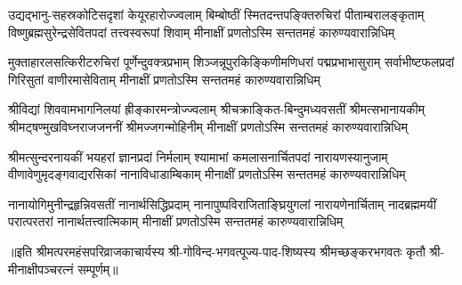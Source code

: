

\fourlineindentedshloka
{उद्यद्भानु-सहस्रकोटिसदृशां केयूरहारोज्ज्वलाम्}
{बिम्बोष्ठीं स्मितदन्तपङ्क्तिरुचिरां पीताम्बरालङ्कृताम्‌}
{विष्णुब्रह्मसुरेन्द्रसेवितपदां तत्त्वस्वरूपां शिवाम्}
{मीनाक्षीं प्रणतोऽस्मि सन्ततमहं कारुण्यवारान्निधिम्‌}%

\fourlineindentedshloka
{मुक्ताहारलसत्किरीटरुचिरां पूर्णेन्दुवक्त्रप्रभाम्}
{शिञ्जन्नूपुरकिङ्किणीमणिधरां पद्मप्रभाभासुराम्‌}
{सर्वाभीष्टफलप्रदां गिरिसुतां वाणीरमासेविताम्}
{मीनाक्षीं प्रणतोऽस्मि सन्ततमहं कारुण्यवारान्निधिम्‌}%

\fourlineindentedshloka
{श्रीविद्यां शिववामभागनिलयां ह्रीङ्कारमन्त्रोज्ज्वलाम्}
{श्रीचक्राङ्कित-बिन्दुमध्यवसतीं श्रीमत्सभानायकीम्}
{श्रीमट्षण्मुखविघ्नराजजननीं श्रीमज्जगन्मोहिनीम्}
{मीनाक्षीं प्रणतोऽस्मि सन्ततमहं कारुण्यवारान्निधिम्}%

\fourlineindentedshloka
{श्रीमत्सुन्दरनायकीं भयहरां ज्ञानप्रदां निर्मलाम्‌}
{श्यामाभां कमलासनार्चितपदां नारायणस्यानुजाम्‌}
{वीणावेणुमृदङ्गवाद्यरसिकां नानाविधाडाम्बिकाम्}
{मीनाक्षीं प्रणतोऽस्मि सन्ततमहं कारुण्यवारान्निधिम्‌}%

\fourlineindentedshloka
{नानायोगिमुनीन्द्रहृन्निवसतीं नानार्थसिद्धिप्रदाम्‌}
{नानापुष्पविराजिताङ्घ्रियुगलां नारायणेनार्चिताम्‌}
{नादब्रह्ममयीं परात्परतरां नानार्थतत्त्वात्मिकाम्}
{मीनाक्षीं प्रणतोऽस्मि सन्ततमहं कारुण्यवारान्निधिम्‌}%

॥इति श्रीमत्परमहंसपरिव्राजकाचार्यस्य श्री-गोविन्द-भगवत्पूज्य-पाद-शिष्यस्य 
श्रीमच्छङ्करभगवतः कृतौ श्री-मीनाक्षीपञ्चरत्नं सम्पूर्णम्॥